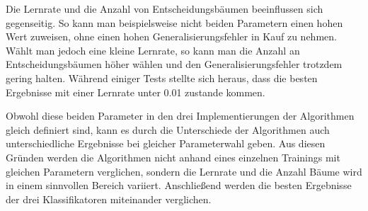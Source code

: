 Die Lernrate und die Anzahl von Entscheidungsb\"aumen beeinflussen sich gegenseitig. So kann man beispielsweise nicht beiden Parametern einen hohen Wert zuweisen, ohne einen hohen Generalisierungsfehler in Kauf zu nehmen. W\"ahlt man jedoch eine kleine Lernrate, so kann man die Anzahl an Entscheidungsb\"aumen h\"oher w\"ahlen und den Generalisierungsfehler trotzdem gering halten. W\"ahrend einiger Tests stellte sich heraus, dass die besten Ergebnisse mit einer Lernrate unter \num{0,01} zustande kommen.

Obwohl diese beiden Parameter in den drei Implementierungen der Algorithmen gleich definiert sind, kann es durch die Unterschiede der Algorithmen auch unterschiedliche Ergebnisse bei gleicher Parameterwahl geben. Aus diesen Gr\"unden werden die Algorithmen nicht anhand eines einzelnen Trainings mit gleichen Parametern verglichen, sondern die Lernrate und die Anzahl B\"aume wird in einem sinnvollen Bereich variiert. Anschlie\ss end werden die besten Ergebnisse der drei Klassifikatoren miteinander verglichen.


